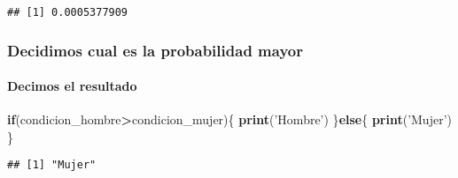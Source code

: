 \documentclass[]{article}
\newenvironment{Shaded}{\begin{snugshade}}{\end{snugshade}}
\newcommand{\KeywordTok}[1]{\textcolor[rgb]{0.13,0.29,0.53}{\textbf{#1}}}
\newcommand{\StringTok}[1]{\textcolor[rgb]{0.31,0.60,0.02}{#1}}
\newcommand{\ControlFlowTok}[1]{\textcolor[rgb]{0.13,0.29,0.53}{\textbf{#1}}}
\newcommand{\OperatorTok}[1]{\textcolor[rgb]{0.81,0.36,0.00}{\textbf{#1}}}
\newcommand{\NormalTok}[1]{#1}
\let\oldparagraph\paragraph
\renewcommand{\paragraph}[1]{\oldparagraph{#1}\mbox{}}
\begin{document}
\begin{Shaded}
\end{Shaded}

\begin{verbatim}
## [1] 0.0005377909
\end{verbatim}

\subsubsection{Decidimos cual es la probabilidad
mayor}\label{decidimos-cual-es-la-probabilidad-mayor}

\paragraph{Decimos el resultado}\label{decimos-el-resultado}

\begin{Shaded}
\begin{Highlighting}[]
\ControlFlowTok{if}\NormalTok{(condicion_hombre}\OperatorTok{>}\NormalTok{condicion_mujer)\{}
  \KeywordTok{print}\NormalTok{(}\StringTok{'Hombre'}\NormalTok{)}
\NormalTok{\}}\ControlFlowTok{else}\NormalTok{\{}
  \KeywordTok{print}\NormalTok{(}\StringTok{'Mujer'}\NormalTok{)}
\NormalTok{\}}
\end{Highlighting}
\end{Shaded}

\begin{verbatim}
## [1] "Mujer"
\end{verbatim}
\end{document}
